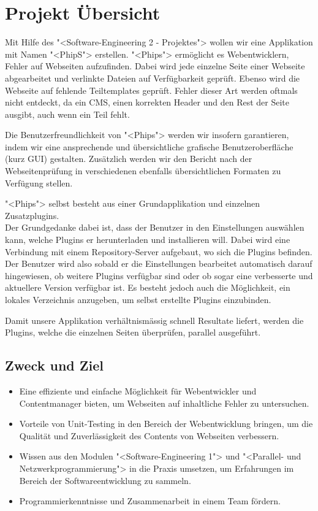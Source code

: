 \chapter{Projekt Übersicht}
Mit Hilfe des "<Software-Engineering 2 - Projektes"> wollen wir eine Applikation mit Namen "<PhipS"> erstellen. "<Phips"> ermöglicht es Webentwicklern, Fehler auf Webseiten aufzufinden. Dabei wird jede einzelne Seite einer Webseite abgearbeitet und verlinkte Dateien auf Verfügbarkeit geprüft. Ebenso wird die Webseite auf fehlende Teiltemplates geprüft. Fehler dieser Art werden oftmals nicht entdeckt, da ein \ac{CMS}, einen korrekten Header und den Rest der Seite ausgibt, auch wenn ein Teil fehlt.

Die Benutzerfreundlichkeit von "<Phips"> werden wir insofern garantieren, indem wir eine ansprechende und übersichtliche grafische Benutzeroberfläche (kurz \ac{GUI}) gestalten. Zusätzlich werden wir den Bericht nach der Webseitenprüfung in verschiedenen ebenfalls übersichtlichen Formaten zu Verfügung stellen.

"<Phips"> selbst besteht aus einer Grundapplikation und einzelnen Zusatzplugins. \\
Der Grundgedanke dabei ist, dass der Benutzer in den Einstellungen auswählen kann, welche Plugins er herunterladen und installieren will. Dabei wird eine Verbindung mit einem Repository-Server aufgebaut, wo sich die Plugins befinden. Der Benutzer wird also sobald er die Einstellungen bearbeitet automatisch darauf hingewiesen, ob weitere Plugins verfügbar sind oder ob sogar eine verbesserte und aktuellere Version verfügbar ist. Es besteht jedoch auch die Möglichkeit, ein lokales Verzeichnis anzugeben, um selbst erstellte Plugins einzubinden.

Damit unsere Applikation verhältnismässig schnell Resultate liefert, werden die Plugins, welche die einzelnen Seiten überprüfen, parallel ausgeführt.
\section{Zweck und Ziel}
\begin{itemize}
 \item Eine effiziente und einfache Möglichkeit für Webentwickler und Contentmanager bieten, um Webseiten auf inhaltliche Fehler zu untersuchen.
 \item Vorteile von Unit-Testing in den Bereich der Webentwicklung bringen, um die Qualität und Zuverlässigkeit des Contents von Webseiten verbessern.
 \item Wissen aus den Modulen "<Software-Engineering 1"> und "<Parallel- und Netzwerkprogrammierung"> in die Praxis umsetzen, um Erfahrungen im Bereich der Softwareentwicklung zu sammeln.
 \item Programmierkenntnisse und Zusammenarbeit in einem Team fördern.
\end{itemize}
